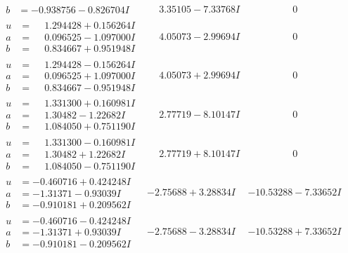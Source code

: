 \documentclass[1p]{elsarticle_modified}
\theoremstyle{definition}
\begin{document}
$$\begin{array}{c|c|c}
\begin{aligned}
b &= -0.938756 - 0.826704 I\end{aligned}
 & \phantom{-}3.35105 - 7.33768 I & \phantom{-0.000000 } 0 \\ \hline\begin{aligned}
u &= \phantom{-}1.294428 + 0.156264 I \\
a &= \phantom{-}0.096525 - 1.097000 I \\
b &= \phantom{-}0.834667 + 0.951948 I\end{aligned}
 & \phantom{-}4.05073 - 2.99694 I & \phantom{-0.000000 } 0 \\ \hline\begin{aligned}
u &= \phantom{-}1.294428 - 0.156264 I \\
a &= \phantom{-}0.096525 + 1.097000 I \\
b &= \phantom{-}0.834667 - 0.951948 I\end{aligned}
 & \phantom{-}4.05073 + 2.99694 I & \phantom{-0.000000 } 0 \\ \hline\begin{aligned}
u &= \phantom{-}1.331300 + 0.160981 I \\
a &= \phantom{-}1.30482 - 1.22682 I \\
b &= \phantom{-}1.084050 + 0.751190 I\end{aligned}
 & \phantom{-}2.77719 - 8.10147 I & \phantom{-0.000000 } 0 \\ \hline\begin{aligned}
u &= \phantom{-}1.331300 - 0.160981 I \\
a &= \phantom{-}1.30482 + 1.22682 I \\
b &= \phantom{-}1.084050 - 0.751190 I\end{aligned}
 & \phantom{-}2.77719 + 8.10147 I & \phantom{-0.000000 } 0 \\ \hline\begin{aligned}
u &= -0.460716 + 0.424248 I \\
a &= -1.31371 - 0.93039 I \\
b &= -0.910181 + 0.209562 I\end{aligned}
 & -2.75688 + 3.28834 I & -10.53288 - 7.33652 I \\ \hline\begin{aligned}
u &= -0.460716 - 0.424248 I \\
a &= -1.31371 + 0.93039 I \\
b &= -0.910181 - 0.209562 I\end{aligned}
 & -2.75688 - 3.28834 I & -10.53288 + 7.33652 I \\ \hline\begin{aligned}

\end{aligned}
\end{array}$$
\end{document}
